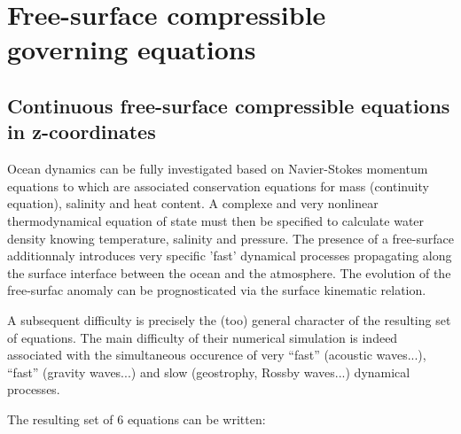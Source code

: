 \documentclass[a4paper,11pt]{article}
\begin{document}
\newpage
\section{Free-surface compressible governing equations}

 \subsection{Continuous free-surface compressible equations in z-coordinates}
 
Ocean dynamics can be fully investigated based on Navier-Stokes momentum  equations to which are associated conservation equations for mass (continuity equation), salinity and heat content. A complexe and very nonlinear thermodynamical equation of state must then be specified to calculate water density knowing temperature, salinity and pressure. The presence of a free-surface additionnaly introduces very specific 'fast' dynamical processes propagating along the surface interface between the ocean and the atmosphere. The evolution of the free-surfac anomaly can be prognosticated via the surface kinematic relation.
 
 A subsequent difficulty is precisely the (too) general character of the resulting set of equations. The main difficulty of their numerical simulation is indeed associated with the simultaneous occurence of very ``fast'' (acoustic waves...), ``fast'' (gravity waves...) and slow (geostrophy, Rossby waves...) dynamical processes.
 
 The resulting set of 6 equations can be written:
 
\end{document}
